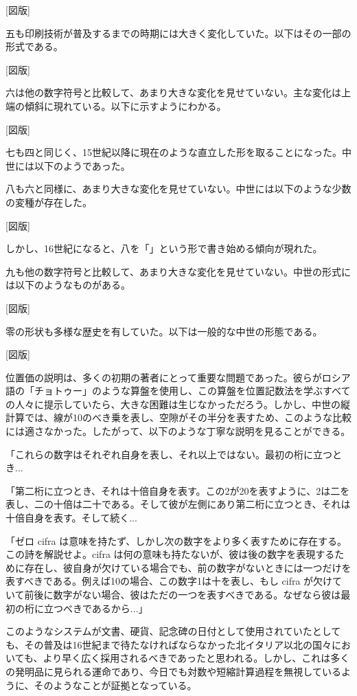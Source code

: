 \documentclass[a4paper,11pt,openany]{ltjsbook}
\begin{document}
[図版]

五も印刷技術が普及するまでの時期には大きく変化していた。以下はその一部の形式である。

[図版]

六は他の数字符号と比較して、あまり大きな変化を見せていない。主な変化は上端の傾斜に現れている。以下に示すようにわかる。

[図版]

七も四と同じく、15世紀以降に現在のような直立した形を取ることになった。中世には以下のようであった。



八も六と同様に、あまり大きな変化を見せていない。中世には以下のような少数の変種が存在した。

[図版]

しかし、16世紀になると、八を「」という形で書き始める傾向が現れた。

九も他の数字符号と比較して、あまり大きな変化を見せていない。中世の形式には以下のようなものがある。

[図版]

零の形状も多様な歴史を有していた。以下は一般的な中世の形態である。

[図版]

位置価の説明は、多くの初期の著者にとって重要な問題であった。彼らがロシア語の「チョトゥー」のような算盤を使用し、この算盤を位置記数法を学ぶすべての人々に提示していたら、大きな困難は生じなかっただろう。しかし、中世の縦計算では、線が10のべき乗を表し、空隙がその半分を表すため、このような比較には適さなかった。したがって、以下のような丁寧な説明を見ることができる。

「これらの数字はそれぞれ自身を表し、それ以上ではない。最初の桁に立つとき...

「第二桁に立つとき、それは十倍自身を表す。この2が20を表すように、2は二を表し、二の十倍は二十である。そして彼が左側にあり第二桁に立つとき、それは十倍自身を表す。そして続く...

「ゼロ cifra は意味を持たず、しかし次の数字をより多く表すために存在する。この詩を解説せよ。cifra は何の意味も持たないが、彼は後の数字を表現するために存在し、彼自身が欠けている場合でも、前の数字がないときには一つだけを表すべきである。例えば10の場合、この数字1は十を表し、もし cifra が欠けていて前後に数字がない場合、彼はただの一つを表すべきである。なぜなら彼は最初の桁に立つべきであるから...」

このようなシステムが文書、硬貨、記念碑の日付として使用されていたとしても、その普及は16世紀まで待たなければならなかった北イタリア以北の国々においても、より早く広く採用されるべきであったと思われる。しかし、これは多くの発明品に見られる運命であり、今日でも対数や短縮計算過程を無視しているように、そのようなことが証拠となっている。
\end{document}

